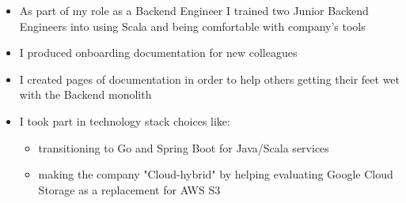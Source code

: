 \documentclass[11pt,a4paper,sans]{moderncv} %
\begin{document}
{\begin{itemize}
\begin{itemize}
                \begin{itemize}
                    \item produced the converted audio
                    \item extracted the audio file cover
                    \item resized the cover according to input resolution
                \end{itemize}
            \item Development of a Scala batch service that started the actual conversion
            \item Using AWS Step Functions for flow and notification management alongside SQS
        \end{itemize}
    \item As part of my role as a Backend Engineer I trained two Junior Backend Engineers into using Scala and being comfortable with company's tools
    \item I produced onboarding documentation for new colleagues
    \item I created pages of documentation in order to help others getting their feet wet with the Backend monolith
    \item I took part in technology stack choices like:
        \begin{itemize}
            \item transitioning to Go and Spring Boot for Java/Scala services
            \item making the company "Cloud-hybrid" by helping evaluating Google Cloud Storage as a replacement for AWS S3
        \end{itemize}
\end{itemize}}

\end{document}
